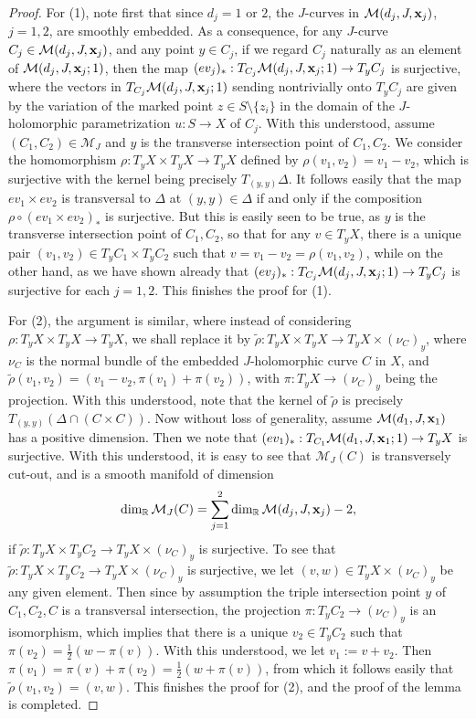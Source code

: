 \documentclass[11pt]{amsart}
\theoremstyle{plain}
\numberwithin{theorem}{section}
\theoremstyle{definition}
\newcommand{\R}{{\mathbb R}}
\newcommand{\M}{{\mathcal M}}
\begin{document}
\begin{proof}
For (1), note first that since $d_j=1$ or $2$, the $J$-curves in $\M(d_j,J, {\bf x}_j)$, $j=1,2$, are smoothly 
embedded. As a consequence, for any $J$-curve $C_j\in \M(d_j,J, {\bf x}_j)$, and any point $y\in C_j$,
if we regard $C_j$ naturally as an element of $\M(d_j,J, {\bf x}_j;1)$, then the map
$(ev_j)_\ast: T_{C_j} \M(d_j,J, {\bf x}_j;1)\rightarrow T_yC_j$ is surjective, where the vectors in 
$T_{C_j} \M(d_j,J, {\bf x}_j;1)$ sending nontrivially onto $T_yC_j$ are given by the variation of the marked point 
$z\in S\setminus \{z_i\}$ in the domain of the $J$-holomorphic parametrization $u: S\rightarrow X$ of $C_j$.
With this understood, assume $(C_1,C_2)\in\M_J$ and $y$ is the transverse intersection point of $C_1,C_2$.
We consider the homomorphism $\rho: T_y X\times T_y X\rightarrow T_y X$ defined by $\rho(v_1,v_2)=v_1-v_2$,
which is surjective with the kernel being precisely $T_{(y,y)}\Delta$. It follows easily that the map
$ev_1\times ev_2$ is transversal to $\Delta$ at $(y,y)\in \Delta$ if and only if the composition 
$\rho\circ (ev_1\times ev_2)_\ast$ is surjective. But this is easily seen to be true, as $y$ is the transverse intersection point of $C_1,C_2$, so that for any $v\in T_y X$, there is a unique pair 
$(v_1,v_2)\in T_y C_1\times T_y C_2$ such that $v=v_1-v_2=\rho(v_1,v_2)$, while on the other hand, as we have shown already that $(ev_j)_\ast: T_{C_j} \M(d_j,J, {\bf x}_j;1)\rightarrow T_yC_j$ is surjective for each $j=1,2$.
This finishes the proof for  (1).

For (2), the argument is similar, where instead of considering $\rho: T_y X\times T_y X\rightarrow T_y X$, we shall
replace it by $\tilde{\rho}: T_y X\times T_y X\rightarrow T_y X\times (\nu_C)_y$, where $\nu_C$ is the normal bundle of the embedded $J$-holomorphic curve $C$ in $X$, and 
$\tilde{\rho}(v_1,v_2)=(v_1-v_2, \pi(v_1)+\pi(v_2))$, with
$\pi: T_y X\rightarrow (\nu_C)_y$ being the projection. With this understood, note that the kernel of $\tilde{\rho}$
is precisely $T_{(y,y)}(\Delta\cap (C\times C))$. Now without loss of generality, assume $\M(d_1,J, {\bf x}_1)$ has a 
positive dimension. Then we note that $(ev_1)_\ast: T_{C_1} \M(d_1,J, {\bf x}_1;1)\rightarrow T_y X$ is 
surjective. With this understood, it is easy to see that $\M_J(C)$ is transversely cut-out, and is a smooth manifold of dimension
$$
\dim_\R \M_J(C)=\sum_{j=1}^2 \dim_\R \M(d_j,J,{\bf x}_j)-2,
$$
if $\tilde{\rho}: T_y X\times T_y C_2\rightarrow T_y X\times (\nu_C)_y$ is surjective. To see that  $\tilde{\rho}: T_y X\times T_y C_2\rightarrow T_y X\times (\nu_C)_y$ is surjective, we let $(v,w)\in T_y X\times (\nu_C)_y$ be any
given element. Then since by assumption the triple intersection point $y$ of $C_1,C_2,C$ is a transversal 
intersection, the projection $\pi: T_y C_2\rightarrow (\nu_C)_y$ is an isomorphism, which implies that there is a unique 
$v_2\in  T_y C_2$ such that $\pi(v_2)=\frac{1}{2}(w-\pi(v))$. With this understood, we let $v_1:=v+v_2$. Then
$\pi(v_1)=\pi(v)+\pi(v_2)=\frac{1}{2}(w+\pi(v))$, from which it follows easily that $\tilde{\rho}(v_1,v_2)=(v,w)$.
This finishes the proof for  (2), and the proof of the lemma is completed.

\end{proof}
\end{document}
